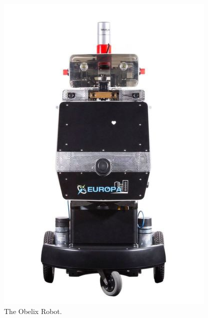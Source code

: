 \begin{figure}
	\centering
	\includegraphics[width=.3\textwidth]{figures/introduction/obelix.jpg}
	\caption{The Obelix Robot.}
\end{figure}